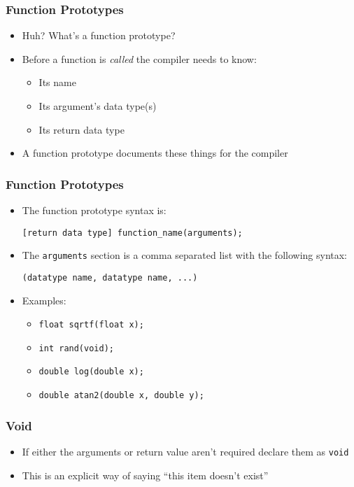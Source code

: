 \documentclass[14pt]{beamer}
\begin{document}
\begin{frame}
\frametitle{Function Prototypes}
\begin{itemize}
\item Huh? What's a function prototype?
\pause
\item Before a function is \textit{called} the compiler needs to know:
	\begin{itemize}
		\item Its name
		\item Its argument's data type(s)
		\item Its return data type 
	\end{itemize}
\pause
\item A function prototype documents these things for the compiler
\end{itemize}
\end{frame}

\begin{frame}[fragile]
\frametitle{Function Prototypes}
\begin{itemize}
\item The function prototype syntax is:
\begin{lstlisting}[style=CStyle]
[return data type] function_name(arguments);
\end{lstlisting}
\pause
\item The \texttt{arguments} section is a comma separated list with the following syntax:
\begin{lstlisting}[style=CStyle]
(datatype name, datatype name, ...)
\end{lstlisting}
\item Examples:
	\begin{itemize}
		\item \texttt{float sqrtf(float x);}
		\item \texttt{int rand(void);}
		\item \texttt{double log(double x);}
		\item \texttt{double atan2(double x, double y);}
	\end{itemize}
\end{itemize}
\end{frame}

\begin{frame}
\frametitle{Void}
\begin{itemize}
\item If either the arguments or return value aren't required declare them as \texttt{void}
\item This is an explicit way of saying ``this item doesn't exist'' 
\end{itemize}
\end{frame}
\end{document}

